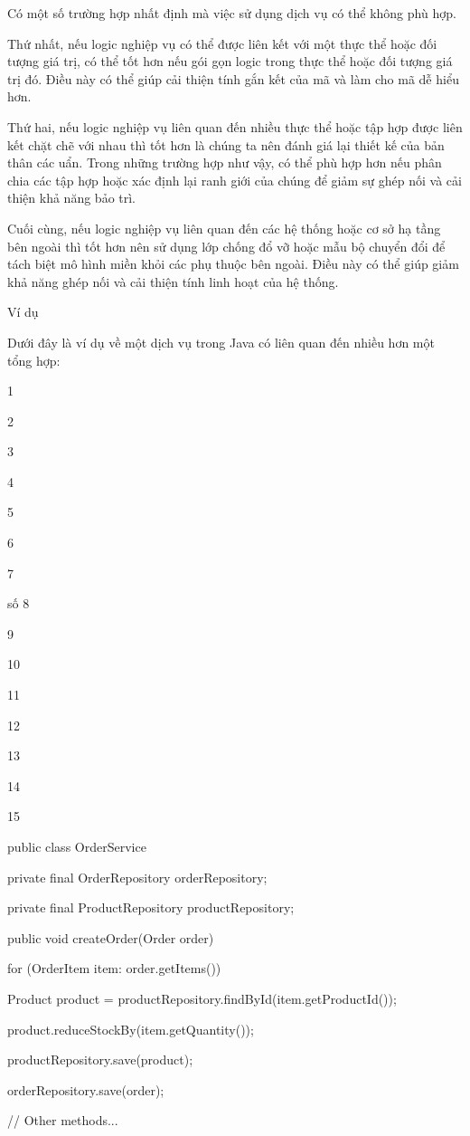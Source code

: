 Có một số trường hợp nhất định mà việc sử dụng dịch vụ có thể không phù hợp.

Thứ nhất, nếu logic nghiệp vụ có thể được liên kết với một thực thể hoặc đối tượng giá trị, có thể tốt hơn nếu gói gọn logic trong thực thể hoặc đối tượng giá trị đó. Điều này có thể giúp cải thiện tính gắn kết của mã và làm cho mã dễ hiểu hơn.

Thứ hai, nếu logic nghiệp vụ liên quan đến nhiều thực thể hoặc tập hợp được liên kết chặt chẽ với nhau thì tốt hơn là chúng ta nên đánh giá lại thiết kế của bản thân các uẩn. Trong những trường hợp như vậy, có thể phù hợp hơn nếu phân chia các tập hợp hoặc xác định lại ranh giới của chúng để giảm sự ghép nối và cải thiện khả năng bảo trì.

Cuối cùng, nếu logic nghiệp vụ liên quan đến các hệ thống hoặc cơ sở hạ tầng bên ngoài thì tốt hơn nên sử dụng lớp chống đổ vỡ hoặc mẫu bộ chuyển đổi để tách biệt mô hình miền khỏi các phụ thuộc bên ngoài. Điều này có thể giúp giảm khả năng ghép nối và cải thiện tính linh hoạt của hệ thống.

Ví dụ

Dưới đây là ví dụ về một dịch vụ trong Java có liên quan đến nhiều hơn một tổng hợp:

1

2

3

4

5

6

7

số 8

9

10

11

12

13

14

15

public class OrderService {

private final OrderRepository orderRepository;

private final ProductRepository productRepository;

public void createOrder(Order order) {

for (OrderItem item: order.getItems()) {

Product product = productRepository.findById(item.getProductId());

product.reduceStockBy(item.getQuantity());

productRepository.save(product);

}

orderRepository.save(order);

}

// Other methods...

}

